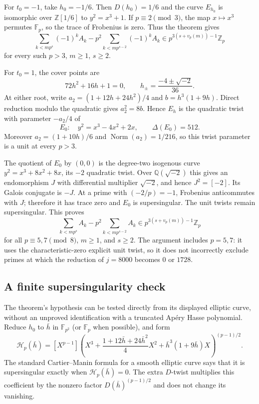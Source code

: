 \documentclass[11pt,letterpaper]{article}
\theoremstyle{definition}
\theoremstyle{remark}
\begin{document}
For $t_0=-1$, take $h_0=-1/6$. Then $D(h_0)=1/6$ and the curve
$E_{h_0}$ is isomorphic over $\mathbb Z[1/6]$ to $y^2=x^3+1$.
If $p\equiv2\pmod3$, the map $x\mapsto x^3$ permutes $\mathbb F_p$,
so the trace of Frobenius is zero. Thus the theorem gives
\[
 \sum_{k<mp^s}(-1)^kA_k-p^2\sum_{k<mp^{s-2}}(-1)^kA_k
 \in p^{3(s+v_p(m))-1}\mathbb Z_p
\]
for every such $p>3$, $m\geq1$, $s\geq2$.

For $t_0=1$, the cover points are
\[
 72h^2+16h+1=0,\qquad h_\pm=\frac{-4\pm\sqrt{-2}}{36}.
\]
At either root, write $a_2=(1+12h+24h^2)/4$ and
$b=h^3(1+9h)$. Direct reduction modulo the quadratic gives
$a_2^2=8b$. Hence $E_h$ is the quadratic twist with parameter $-a_2/4$
of
\[
 E_0:\quad y^2=x^3-4x^2+2x,\qquad\Delta(E_0)=512.
\]
Moreover $a_2=(1+10h)/6$ and $\operatorname{Norm}(a_2)=1/216$, so
this twist parameter is a unit at every $p>3$.

The quotient of $E_0$ by $(0,0)$ is the degree-two isogenous curve
$y^2=x^3+8x^2+8x$, its $-2$ quadratic twist. Over
$\mathbb Q(\sqrt{-2})$ this gives an endomorphism $J$ with differential
multiplier $\sqrt{-2}$, and hence $J^2=[-2]$. Its Galois conjugate is
$-J$. At a prime with $(-2/p)=-1$, Frobenius anticommutes with $J$;
therefore it has trace zero and $E_0$ is supersingular. The unit twists
remain supersingular. This proves
\[
 \sum_{k<mp^s}A_k-p^2\sum_{k<mp^{s-2}}A_k
 \in p^{3(s+v_p(m))-1}\mathbb Z_p
\]
for all $p\equiv5,7\pmod8$, $m\geq1$, and $s\geq2$.
The argument includes $p=5,7$: it uses the characteristic-zero explicit
unit twist, so it does not incorrectly exclude primes at which the
reduction of $j=8000$ becomes $0$ or $1728$.

\subsection{A finite supersingularity check}

The theorem's hypothesis can be tested directly from its displayed
elliptic curve, without an unproved identification with a truncated
Ap\'ery Hasse polynomial. Reduce $h_0$ to $\bar h$ in $\mathbb F_{p^2}$
(or $\mathbb F_p$ when possible), and form
\[
 \mathcal H_p(\bar h)=
 [X^{p-1}]\left(X^3+\frac{1+12\bar h+24\bar h^2}{4}X^2
                  +\bar h^3(1+9\bar h)X\right)^{(p-1)/2}.
\]
The standard Cartier--Manin formula for a smooth elliptic curve says
that it is supersingular exactly when $\mathcal H_p(\bar h)=0$.
The extra $D$-twist multiplies this coefficient by the nonzero factor
$D(\bar h)^{(p-1)/2}$ and does not change its vanishing.
\end{document}
